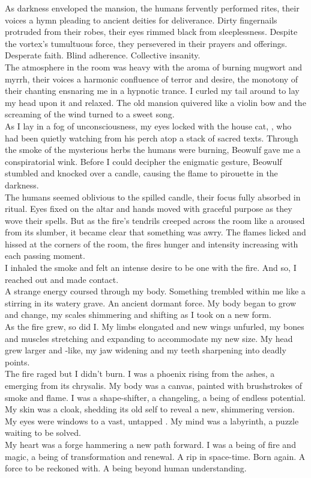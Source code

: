 As darkness enveloped the mansion, the humans fervently performed rites, their voices a hymn pleading to ancient deities for deliverance. Dirty fingernails protruded from their robes, their eyes rimmed black from sleeplessness. Despite the vortex's tumultuous force, they persevered in their prayers and offerings. Desperate faith. Blind adherence. Collective insanity. \\
The atmosphere in the room was heavy with the aroma of burning mugwort and myrrh, their voices a harmonic confluence of terror and desire, the monotony of their chanting ensnaring me in a hypnotic trance. I curled my tail around to lay my head upon it and relaxed. The old mansion quivered like a violin bow and the screaming of the wind turned to a sweet song. \\

As I lay in a fog of unconsciousness, my eyes locked with the house cat, , who had been quietly watching from his perch atop a stack of sacred texts. Through the smoke of the mysterious herbs the humans were burning, Beowulf gave me a conspiratorial wink. Before I could decipher the enigmatic gesture, Beowulf stumbled and knocked over a candle, causing the flame to pirouette in the darkness. \\
The humans seemed oblivious to the spilled candle, their focus fully absorbed in ritual. Eyes fixed on the altar and hands moved with graceful purpose as they wove their spells. But as the fire's tendrils creeped across the room like a  aroused from its slumber, it became clear that something was awry. The flames licked and hissed at the corners of the room, the fires hunger and intensity increasing with each passing moment. \\

I inhaled the smoke and felt an intense desire to be one with the fire. And so, I reached out and made contact. \\
A strange energy coursed through my body. Something trembled within me like a  stirring in its watery grave. An ancient dormant force. My body began to grow and change, my scales shimmering and shifting as I took on a new form. \\
As the fire grew, so did I. My limbs elongated and new wings unfurled, my bones and muscles stretching and expanding to accommodate my new size. My head grew larger and -like, my jaw widening and my teeth sharpening into deadly points. \\
The fire raged but I didn't burn. I was a phoenix rising from the ashes, a  emerging from its chrysalis. My body was a canvas, painted with brushstrokes of smoke and flame. I was a shape-shifter, a changeling, a being of endless potential. My skin was a cloak, shedding its old self to reveal a new, shimmering version. My eyes were windows to a vast, untapped . My mind was a labyrinth, a puzzle waiting to be solved. \\
My heart was a forge hammering a new path forward. I was a being of fire and magic, a being of transformation and renewal. A rip in space-time. Born again. A force to be reckoned with. A being beyond human understanding. \\

